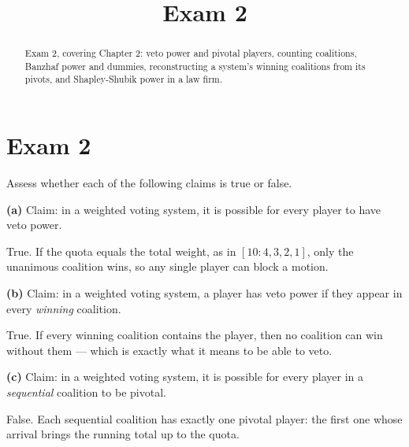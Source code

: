 \documentclass[12pt]{ximera}
\title{Exam 2}
\begin{document}
\begin{abstract}
Exam 2, covering Chapter 2: veto power and pivotal players, counting coalitions,
Banzhaf power and dummies, reconstructing a system's winning coalitions from its
pivots, and Shapley-Shubik power in a law firm.
\end{abstract}
\maketitle

\section*{Exam 2}

\begin{problem}
Assess whether each of the following claims is true or false.

\begin{prompt}
\textbf{(a)} Claim: in a weighted voting system, it is possible for every player to
have veto power.

\begin{multipleChoice}
\end{multipleChoice}

\begin{feedback}
True. If the quota equals the total weight, as in $[10:4,3,2,1]$, only the unanimous
coalition wins, so any single player can block a motion.
\end{feedback}
\end{prompt}

\begin{prompt}
\textbf{(b)} Claim: in a weighted voting system, a player has veto power if they appear
in every \emph{winning} coalition.

\begin{multipleChoice}
\end{multipleChoice}

\begin{feedback}
True. If every winning coalition contains the player, then no coalition can win without
them --- which is exactly what it means to be able to veto.
\end{feedback}
\end{prompt}

\begin{prompt}
\textbf{(c)} Claim: in a weighted voting system, it is possible for every player in a
\emph{sequential} coalition to be pivotal.

\begin{multipleChoice}
\end{multipleChoice}

\begin{feedback}
False. Each sequential coalition has exactly one pivotal player: the first one whose
arrival brings the running total up to the quota.
\end{feedback}
\end{prompt}
\end{problem}
\end{document}
